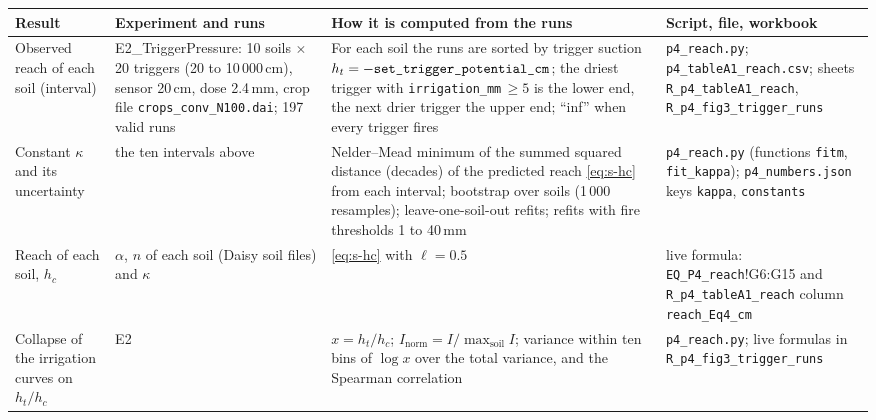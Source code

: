 
{\footnotesize\begin{longtable}{>{\raggedright\arraybackslash}p{}>{\raggedright\arraybackslash}p{}>{\raggedright\arraybackslash}p{}>{\raggedright\arraybackslash}p{}}
\toprule Result & Experiment and runs & How it is computed from the runs & Script, file, workbook\\\midrule\endhead
Observed reach of each soil (interval) & E2\_\allowbreak{}TriggerPressure: 10 soils $\times$ 20 triggers (20 to 10\,000\,cm), sensor 20\,cm, dose 2.4\,mm, crop file \texttt{crops\_\allowbreak{}conv\_\allowbreak{}N100.dai}; 197 valid runs & For each soil the runs are sorted by trigger suction $h_t=-\texttt{set\_\allowbreak{}trigger\_\allowbreak{}potential\_\allowbreak{}cm}$; the driest trigger with \texttt{irrigation\_\allowbreak{}mm}\,$\ge5$ is the lower end, the next drier trigger the upper end; ``inf'' when every trigger fires & \texttt{p4\_\allowbreak{}reach.py}; \texttt{p4\_\allowbreak{}tableA1\_\allowbreak{}reach.csv}; sheets \texttt{R\_\allowbreak{}p4\_\allowbreak{}tableA1\_\allowbreak{}reach}, \texttt{R\_\allowbreak{}p4\_\allowbreak{}fig3\_\allowbreak{}trigger\_\allowbreak{}runs}\\
Constant $\kappa$ and its uncertainty & the ten intervals above & Nelder--Mead minimum of the summed squared distance (decades) of the predicted reach \cref{eq:s-hc} from each interval; bootstrap over soils (1\,000 resamples); leave-one-soil-out refits; refits with fire thresholds 1 to 40\,mm & \texttt{p4\_\allowbreak{}reach.py} (functions \texttt{fitm}, \texttt{fit\_\allowbreak{}kappa}); \texttt{p4\_\allowbreak{}numbers.json} keys \texttt{kappa}, \texttt{constants}\\
Reach of each soil, $h_c$ & $\alpha$, $n$ of each soil (Daisy soil files) and $\kappa$ & \cref{eq:s-hc} with $\ell=0.5$ & live formula: \texttt{EQ\_\allowbreak{}P4\_\allowbreak{}reach}!G6:G15 and \texttt{R\_\allowbreak{}p4\_\allowbreak{}tableA1\_\allowbreak{}reach} column \texttt{reach\_\allowbreak{}Eq4\_\allowbreak{}cm}\\
Collapse of the irrigation curves on $h_t/h_c$ & E2 & $x=h_t/h_c$; $I_{\mathrm{norm}}=I/\max_{\text{soil}}I$; variance within ten bins of $\log x$ over the total variance, and the Spearman correlation & \texttt{p4\_\allowbreak{}reach.py}; live formulas in \texttt{R\_\allowbreak{}p4\_\allowbreak{}fig3\_\allowbreak{}trigger\_\allowbreak{}runs}\\

\end{longtable}}
